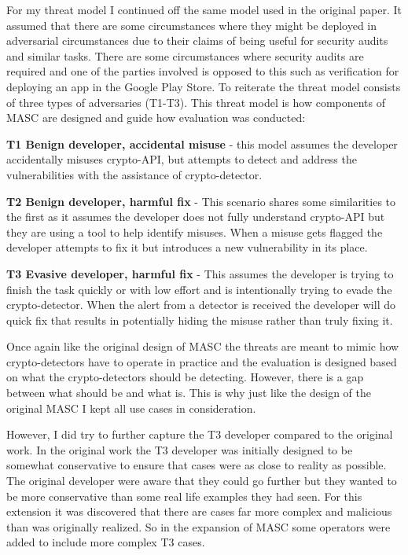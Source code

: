 For my threat model I continued off the same model used in the original paper. It assumed that there are some circumstances where they might be deployed in adversarial circumstances due to their claims of being useful for security audits and similar tasks. There are some circumstances where security audits are required and one of the parties involved is opposed to this such as verification for deploying an app in the Google Play Store. To reiterate the threat model consists of three types of adversaries (T1-T3). This threat model is how components of MASC are designed and guide how evaluation was conducted:

\textbf{T1 Benign developer, accidental misuse} - this model assumes the developer accidentally misuses crypto-API, but attempts to detect and address the vulnerabilities with the assistance of crypto-detector.

\textbf{T2 Benign developer, harmful fix} - This scenario shares some similarities to the first as it assumes the developer does not fully understand crypto-API but they are using a tool to help identify misuses. When a misuse gets flagged the developer attempts to fix it but introduces a new vulnerability in its place.

\textbf{T3 Evasive developer, harmful fix} - This assumes the developer is trying to finish the task quickly or with low effort and is intentionally trying to evade the crypto-detector. When the alert from a detector is received the developer will do quick fix that results in potentially hiding the misuse rather than truly fixing it.

Once again like the original design of MASC the threats are meant to mimic how crypto-detectors have to operate in practice and the evaluation is designed based on what the crypto-detectors should be detecting. However, there is a gap between what should be and what is. This is why just like the design of the original MASC I kept all use cases in consideration. 

However, I did try to further capture the T3 developer compared to the original work. In the original work the T3 developer was initially designed to be somewhat conservative to ensure that cases were as close to reality as possible. The original developer were aware that they could go further but they wanted to be more conservative than some real life examples they had seen. For this extension it was discovered that there are cases far more complex and malicious than was originally realized. So in the expansion of MASC some operators were added to include more complex T3 cases.

